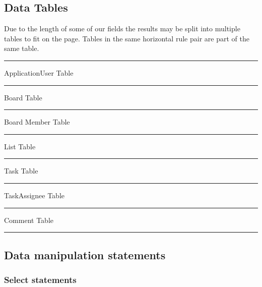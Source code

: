 \documentclass[letterpaper]{article}
\begin{document}

\subsection{Data Tables}
Due to the length of some of our fields the results may be split into multiple tables to fit on the page. Tables in the same horizontal rule pair are part of the same table.\\

\hrule
ApplicationUser Table
\hrule
Board Table
\pagebreak
\hrule
Board Member Table
\hrule
List Table
\hrule
Task Table
\hrule
TaskAssignee Table
\hrule
Comment Table
\hrule
\pagebreak
\subsection{Data manipulation statements}

\subsubsection{Select statements}
\end{document}
